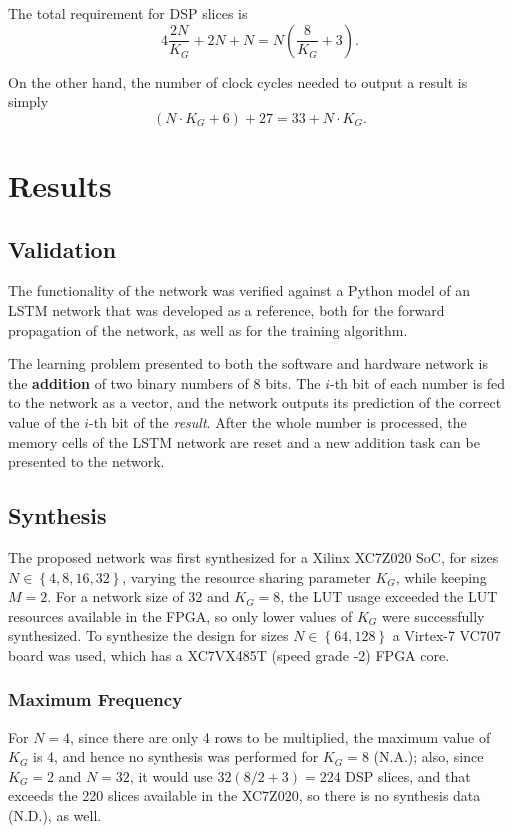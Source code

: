 \documentclass{IEEEtran}
\begin{document}
The total requirement for DSP slices is
\begin{equation}\label{eq:numdsp_network-opt}
    4\frac{2N}{K_G} + 2N + N = N \left( \frac{8}{K_G} + 3 \right).
\end{equation}

On the other hand, the number of clock cycles needed to output a result is simply
\begin{equation}\label{eq:numcc_network-opt}
    (N \cdot K_G + 6) + 27  = 33 + N\cdot K_G.
\end{equation}

\section{Results}\label{sec:results}
\subsection{Validation}\label{sec:res-val}

The functionality of the network was verified against a Python model of an LSTM network that was developed as a reference,
both for the forward propagation of the network, as well as for the training algorithm.

The learning problem presented to both the software and hardware network is the \textbf{addition} of two binary numbers of 8 bits. The $i$-th
bit of each number is fed to the network as a vector, and the network outputs its prediction of the correct value of the $i$-th bit
of the \emph{result}. After the whole number is processed, the memory cells of the LSTM network are reset and a new addition
task can be presented to the network.

\subsection{Synthesis}\label{sec:results_synth}
The proposed network was first synthesized for a Xilinx XC7Z020 SoC, for sizes $N \in \left\{4, 8, 16, 32\right\}$, varying the resource sharing parameter $K_G$, while keeping $M=2$.
For a network size of 32 and $K_G=8$, the LUT usage exceeded the LUT resources available in the FPGA, so only lower values of $K_G$ were
successfully synthesized. To synthesize the design for sizes $N \in \left\{64, 128 \right\}$ a Virtex-7 VC707 board was used, which has a XC7VX485T (speed grade -2) FPGA core.

\subsubsection{Maximum Frequency}\label{sec:results_synth_maxfreq}
For $N=4$, since there are only 4 rows to be multiplied, the maximum value of $K_G$ is 4, and hence no synthesis was performed for $K_G = 8$ (N.A.); also,
since $K_G = 2$ and $N=32$, it would use $32(8/2+3) = 224$ DSP slices, and that exceeds the 220 slices
available in the XC7Z020, so there is no synthesis data (N.D.), as well.
\end{document}
